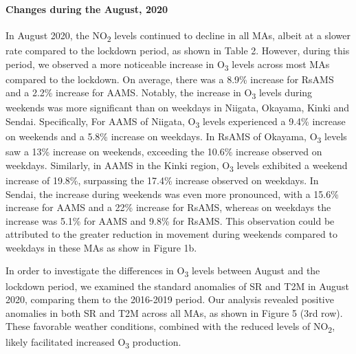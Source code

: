 \paragraph*{Changes during the August, 2020}
In August 2020, the NO\textsubscript{2} levels continued to decline in all MAs, albeit at a slower rate compared to the lockdown period, as shown in Table 2. However, during this period, we observed a more noticeable increase in O\textsubscript{3} levels across most MAs compared to the lockdown. On average, there was a 8.9\% increase for RsAMS and a 2.2\% increase for AAMS. Notably, the increase in O\textsubscript{3} levels during weekends was more significant than on weekdays in Niigata, Okayama, Kinki and Sendai. Specifically, For AAMS of Niigata, O\textsubscript{3} levels experienced a 9.4\% increase on weekends and a 5.8\% increase on weekdays. In RsAMS of Okayama, O\textsubscript{3} levels saw a 13\% increase on weekends, exceeding the 10.6\% increase observed on weekdays. Similarly, in AAMS in the Kinki region, O\textsubscript{3} levels exhibited a weekend increase of 19.8\%, surpassing the 17.4\% increase observed on weekdays. In Sendai, the increase during weekends was even more pronounced, with a 15.6\% increase for AAMS and a 22\% increase for RsAMS, whereas on weekdays the increase was 5.1\% for AAMS and 9.8\% for RsAMS. This observation could be attributed to the greater reduction in movement during weekends compared to weekdays in these MAs as show in Figure 1b. \par
In order to investigate the differences in O\textsubscript{3} levels between August and the lockdown period, we examined the standard anomalies of SR and T2M in August 2020, comparing them to the 2016-2019 period. Our analysis revealed positive anomalies in both SR and T2M across all MAs, as shown in Figure 5 (3rd row). These favorable weather conditions, combined with the reduced levels of NO\textsubscript{2}, likely facilitated increased O\textsubscript{3} production. \par

